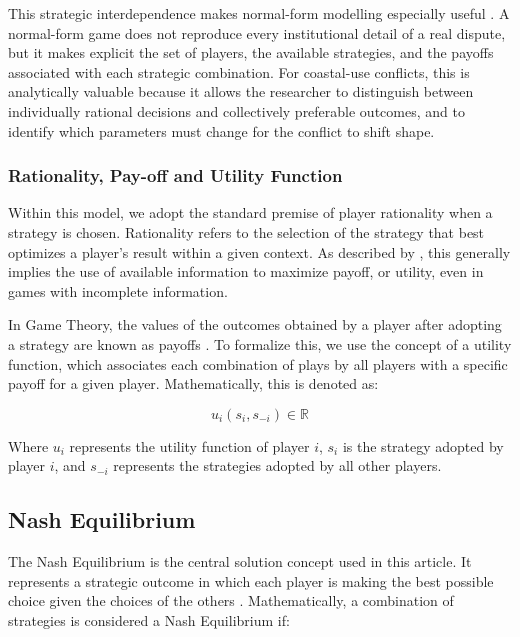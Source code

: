\documentclass[final,times,authoryear]{elsarticle}
\begin{document}
This strategic interdependence makes normal-form modelling especially useful \citep{gillman2019}. A normal-form game does not reproduce every institutional detail of a real dispute, but it makes explicit the set of players, the available strategies, and the payoffs associated with each strategic combination. For coastal-use conflicts, this is analytically valuable because it allows the researcher to distinguish between individually rational decisions and collectively preferable outcomes, and to identify which parameters must change for the conflict to shift shape.

\subsubsection{Rationality, Pay-off and Utility Function}

Within this model, we adopt the standard premise of player rationality when a strategy is chosen. Rationality refers to the selection of the strategy that best optimizes a player's result within a given context. As described by \citep{pianezzer2023}, this generally implies the use of available information to maximize payoff, or utility, even in games with incomplete information.

In Game Theory, the values of the outcomes obtained by a player after adopting a strategy are known as payoffs \citep{pianezzer2023}. To formalize this, we use the concept of a utility function, which associates each combination of plays by all players with a specific payoff for a given player. Mathematically, this is denoted as:

    \begin{equation}
        u_i(s_i, s_{-i}) \in \mathbb{R}
    \end{equation}

Where $u_i$ represents the utility function of player $i$, $s_i$ is the strategy adopted by player $i$, and $s_{-i}$ represents the strategies adopted by all other players.

\subsection{Nash Equilibrium}

The Nash Equilibrium is the central solution concept used in this article. It represents a strategic outcome in which each player is making the best possible choice given the choices of the others \citep{pianezzer2023,gillman2019}. Mathematically, a combination of strategies is considered a Nash Equilibrium if:
\end{document}
